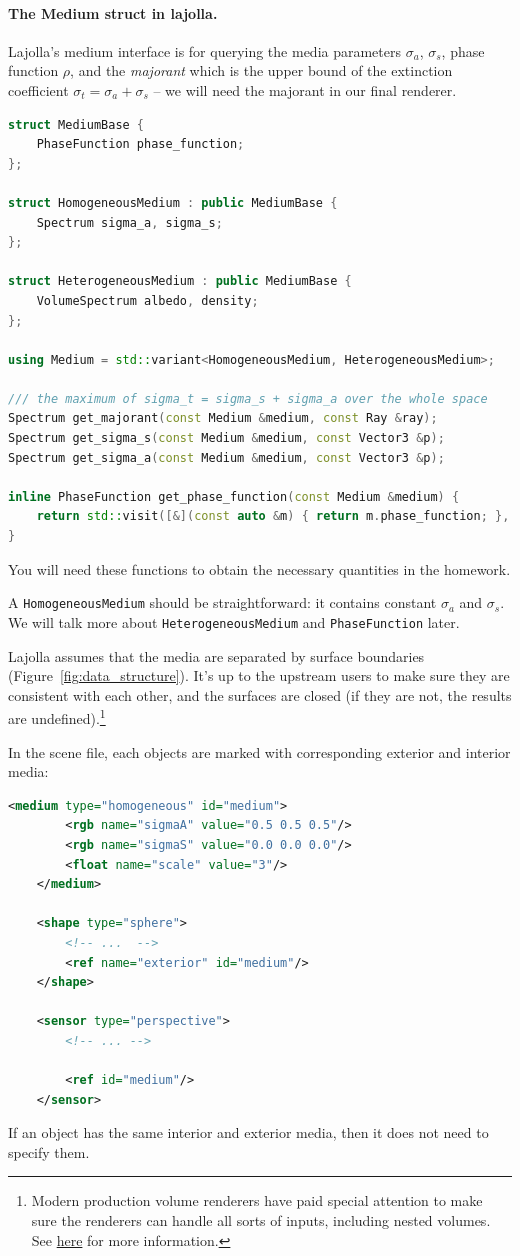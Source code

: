 \paragraph{The Medium struct in lajolla.} Lajolla's medium interface is for querying the media parameters $\sigma_a$, $\sigma_s$, phase function $\rho$, and the \emph{majorant} which is the upper bound of the extinction coefficient $\sigma_t = \sigma_a + \sigma_s$ -- we will need the majorant in our final renderer. 
\begin{lstlisting}[language=c++]
struct MediumBase {
    PhaseFunction phase_function;
};

struct HomogeneousMedium : public MediumBase {
    Spectrum sigma_a, sigma_s;
};

struct HeterogeneousMedium : public MediumBase {
    VolumeSpectrum albedo, density;
};

using Medium = std::variant<HomogeneousMedium, HeterogeneousMedium>;

/// the maximum of sigma_t = sigma_s + sigma_a over the whole space
Spectrum get_majorant(const Medium &medium, const Ray &ray);
Spectrum get_sigma_s(const Medium &medium, const Vector3 &p);
Spectrum get_sigma_a(const Medium &medium, const Vector3 &p);

inline PhaseFunction get_phase_function(const Medium &medium) {
    return std::visit([&](const auto &m) { return m.phase_function; }, medium);
}
\end{lstlisting}
You will need these functions to obtain the necessary quantities in the homework.

A \lstinline{HomogeneousMedium} should be straightforward: it contains constant $\sigma_a$ and $\sigma_s$.
We will talk more about \lstinline{HeterogeneousMedium} and \lstinline{PhaseFunction} later.

Lajolla assumes that the media are separated by surface boundaries (Figure~\ref{fig:data_structure}). It's up to the upstream users to make sure they are consistent with each other, and the surfaces are closed (if they are not, the results are undefined).\footnote{Modern production volume renderers have paid special attention to make sure the renderers can handle all sorts of inputs, including nested volumes. See \href{https://graphics.pixar.com/library/ProductionVolumeRendering/index.html}{here} for more information.}

In the scene file, each objects are marked with corresponding exterior and interior media:
\begin{lstlisting}[language=xml]
    <medium type="homogeneous" id="medium">
        <rgb name="sigmaA" value="0.5 0.5 0.5"/>
        <rgb name="sigmaS" value="0.0 0.0 0.0"/>
        <float name="scale" value="3"/>
    </medium>

    <shape type="sphere">
        <!-- ...  -->
        <ref name="exterior" id="medium"/>
    </shape>

    <sensor type="perspective">
        <!-- ... -->

        <ref id="medium"/>
    </sensor>
\end{lstlisting}
If an object has the same interior and exterior media, then it does not need to specify them. 

